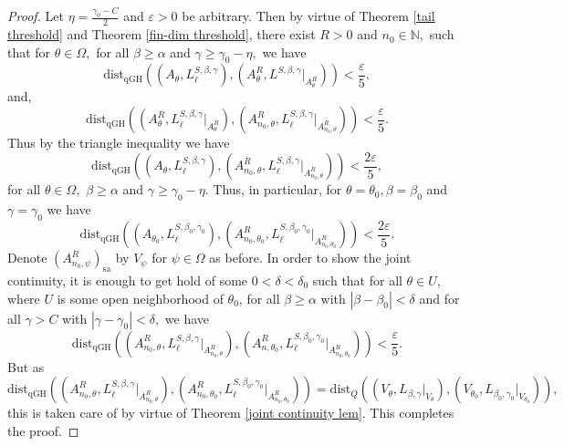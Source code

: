 \documentclass[a4paper,11pt,reqno]{amsart}
\theoremstyle{plain}
\theoremstyle{mainthmstyle}
\theoremstyle{named}
\numberwithin{equation}{section}
\begin{document}
\begin{proof}
Let $\eta= \frac {\gamma_0 - C} {2}$ and $\varepsilon > 0$ be arbitrary. Then by virtue of Theorem \ref{tail threshold} and Theorem \ref{fin-dim threshold}, there exist $R > 0$ and $n_0 \in \mathbb N,$ such that for $\theta \in \Omega,$ for all $\beta \geq \alpha $ and $\gamma \geq \gamma_0 - \eta,$ we have
$$\mathrm{dist}_{\mathrm{qGH}} \left (\left (A_{\theta}, L^{S,\beta, \gamma}_{\ell} \right ), \left (A_{\theta}^{R}, L^{S,\beta,\gamma} \big \rvert_{A_{\theta}^{R}} \right ) \right ) < \frac {\varepsilon} {5},$$ and,
$$\mathrm{dist}_{\mathrm{qGH}} \left (\left (A_{\theta}^{R}, L^{S,\beta, \gamma}_{\ell} \big \rvert_{A_{\theta}^{R}} \right ), \left (A_{n_0, \theta}^{R}, L_{\ell}^{S,\beta,\gamma} \big \rvert_{A_{n_0, \theta}^{R}} \right )  \right ) < \frac {\varepsilon} {5}.$$
Thus by the triangle inequality we have
$$\mathrm{dist}_{\mathrm{qGH}} \left (\left (A_{\theta}, L_{\ell}^{S,\beta, \gamma} \right ), \left (A_{n_0, \theta}^{R}, L_{\ell}^{S,\beta, \gamma} \big \rvert_{A_{n_0, \theta}^{R}} \right ) \right ) < \frac {2 \varepsilon} {5},$$ for all $\theta \in \Omega,$ $\beta \geq\alpha $ and $\gamma \geq \gamma_0 - \eta.$ Thus, in particular, for $\theta = \theta_0,\beta=\beta_0$ and $\gamma = \gamma_0$ we have
$$\mathrm{dist}_{\mathrm{qGH}} \left (\left (A_{\theta_0}, L_{\ell}^{S,\beta_0, \gamma_0} \right ), \left (A_{n_0, \theta_0}^{R}, L_{\ell}^{S,\beta_0, \gamma_0} \big \rvert_{A_{n_0, \theta_0}^{R}} \right ) \right ) < \frac {2 \varepsilon} {5}.$$
Denote $\left (A_{n_0, \psi}^{R} \right )_{\mathrm {sa}}$ by $V_{\psi}$ for $\psi \in \Omega$ as before. In order to show the joint continuity, it is enough to get hold of some $0 < \delta < \delta_0$ such that for all $\theta \in U$, where $U$ is some open neighborhood of $\theta_0$, for all $\beta \geq \alpha$ with $\left \lvert \beta - \beta_0 \right \rvert < \delta$ and for all $\gamma > C$ with $\left \lvert \gamma - \gamma_0 \right \rvert < \delta,$ we have
$$\mathrm{dist}_{\mathrm{qGH}} \left (\left (A_{n_0, \theta}^{R}, L_{\ell}^{S,\beta, \gamma} \big \rvert_{A_{n_0, \theta}^{R}} \right ), \left (A_{n, \theta_0}^{R}, L_{\ell}^{S,\beta_0, \gamma_0} \big \rvert_{A_{n_0, \theta_0}^{R}} \right ) \right ) < \frac {\varepsilon} {5}.$$
But as 
\begin{displaymath}
    \mathrm{dist}_{\mathrm{qGH}} \left (\left (A_{n_0, \theta}^{R}, L_{\ell}^{S,\beta, \gamma} \big \rvert_{A_{n_0, \theta}^{R}} \right ), \left (A_{n_0, \theta_0}^{R}, L_{\ell}^{S,\beta_0, \gamma_0} \big \rvert_{A_{n_0, \theta_0}^{R}} \right ) \right )=\mathrm{dist}_{Q} \left (\left (V_{\theta}, L_{\beta, \gamma} \big \rvert_{V_{\theta}} \right ), \left (V_{\theta_0}, L_{\beta_0, \gamma_0} \big \rvert_{V_{\theta_0}} \right ) \right ),
\end{displaymath}
this is taken care of by virtue of Theorem \ref{joint continuity lem}. This completes the proof.

\end{proof}
\end{document}
